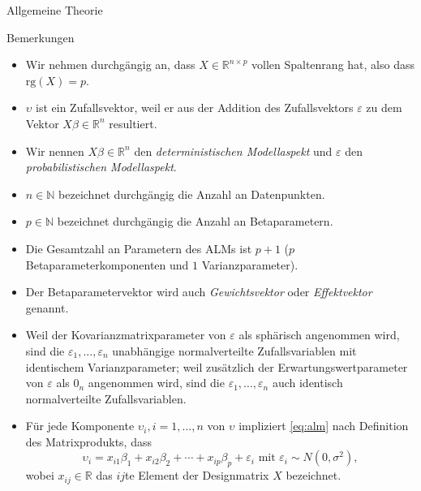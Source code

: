 \documentclass[
  8pt,
  ignorenonframetext,
]{beamer}
\providecommand{\tightlist}{%
  \setlength{\itemsep}{0pt}\setlength{\parskip}{0pt}}
\begin{document}
\begin{frame}{Allgemeine Theorie}
\protect\hypertarget{allgemeine-theorie-1}{}
\footnotesize

Bemerkungen 

\begin{itemize}
\tightlist
\item
  \justifying Wir nehmen durchgängig an, dass
  \(X \in \mathbb{R}^{n \times p}\) vollen Spaltenrang hat, also dass
  \(\mbox{rg}(X)=p\).
\item
  \(\upsilon\) ist ein Zufallsvektor, weil er aus der Addition des
  Zufallsvektors \(\varepsilon\) zu dem Vektor
  \(X\beta \in \mathbb{R}^n\) resultiert.
\item
  Wir nennen \(X\beta \in \mathbb{R}^n\) den
  \textit{deterministischen Modellaspekt} und \(\varepsilon\) den
  \textit{probabilistischen Modellaspekt}.
\item
  \(n \in \mathbb{N}\) bezeichnet durchgängig die Anzahl an
  Datenpunkten.
\item
  \(p \in \mathbb{N}\) bezeichnet durchgängig die Anzahl an
  Betaparametern.
\item
  Die Gesamtzahl an Parametern des ALMs ist \(p + 1\) (\(p\)
  Betaparameterkomponenten und \(1\) Varianzparameter).
\item
  Der Betaparametervektor wird auch \textit{Gewichtsvektor} oder
  \textit{Effektvektor} genannt.
\item
  Weil der Kovarianzmatrixparameter von \(\varepsilon\) als sphärisch
  angenommen wird, sind die \(\varepsilon_1,...,\varepsilon_n\)
  unabhängige normalverteilte Zufallsvariablen mit identischem
  Varianzparameter; weil zusätzlich der Erwartungswertparameter von
  \(\varepsilon\) als \(0_n\) angenommen wird, sind die
  \(\varepsilon_1,...,\varepsilon_n\) auch identisch normalverteilte
  Zufallsvariablen.
\item
  Für jede Komponente \(\upsilon_i, i = 1,...,n\) von \(\upsilon\)
  impliziert \eqref{eq:alm} nach Definition des Matrixprodukts, dass
  \begin{equation}
  \upsilon_i = x_{i1}\beta_1 + x_{i2}\beta_2 + \cdots +  x_{ip}\beta_p + \varepsilon_i \mbox{ mit } \varepsilon_i \sim N\left(0,\sigma^2\right),
  \end{equation} wobei \(x_{ij} \in \mathbb{R}\) das \(ij\)te Element
  der Designmatrix \(X\) bezeichnet.
\end{itemize}
\end{frame}
\end{document}

